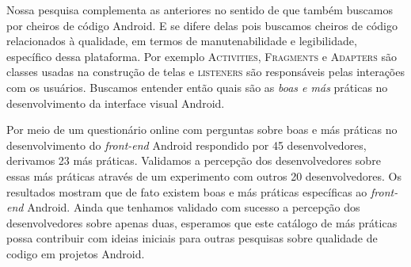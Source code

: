 
Nossa pesquisa complementa as anteriores no sentido de que também buscamos por cheiros de código Android. E se difere delas pois buscamos cheiros de código relacionados à qualidade, em termos de manutenabilidade e legibilidade, específico dessa plataforma. Por exemplo \textsc{Activities}, \textsc{Fragments} e \textsc{Adapters} são classes usadas na construção de telas e \textsc{listeners} são responsáveis pelas interações com os usuários. Buscamos entender então quais são as \emph{boas e más} práticas no desenvolvimento da interface visual Android. 


 

Por meio de um questionário online com perguntas sobre boas e más práticas no desenvolvimento do \textit{front-end} Android respondido por 45 desenvolvedores, derivamos 23 más práticas. Validamos a percepção dos desenvolvedores sobre essas más práticas através de um experimento com outros 20 desenvolvedores. Os resultados mostram que de fato existem boas e más práticas específicas ao \textit{front-end} Android. Ainda que tenhamos validado com sucesso a percepção dos desenvolvedores sobre apenas duas, esperamos que este catálogo de más práticas possa contribuir com ideias iniciais para outras pesquisas sobre qualidade de codigo em projetos Android.


